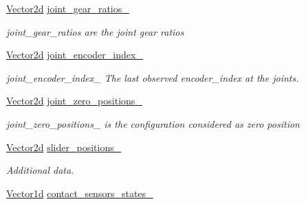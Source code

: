 \begin{DoxyCompactItemize}
\mbox{\label{classblmc__robots_1_1Teststand_ad7b3b6c032d1b1b9c886089ea21a9c2a}} 
\hyperlink{common__header_8hpp_acb6916bc8c9fe9d98c484fd4cc201447}{Vector2d} \hyperlink{classblmc__robots_1_1Teststand_ad7b3b6c032d1b1b9c886089ea21a9c2a}{joint\+\_\+gear\+\_\+ratios\+\_\+}
\begin{DoxyCompactList}\small\item\em joint\+\_\+gear\+\_\+ratios are the joint gear ratios \end{DoxyCompactList}\item 
\mbox{\label{classblmc__robots_1_1Teststand_a2a0b967c36ea63a8bb564bdeebcc0846}} 
\hyperlink{common__header_8hpp_acb6916bc8c9fe9d98c484fd4cc201447}{Vector2d} \hyperlink{classblmc__robots_1_1Teststand_a2a0b967c36ea63a8bb564bdeebcc0846}{joint\+\_\+encoder\+\_\+index\+\_\+}
\begin{DoxyCompactList}\small\item\em joint\+\_\+encoder\+\_\+index\+\_\+ The last observed encoder\+\_\+index at the joints. \end{DoxyCompactList}\item 
\mbox{\label{classblmc__robots_1_1Teststand_a5923674652df619a0692333fb27b8369}} 
\hyperlink{common__header_8hpp_acb6916bc8c9fe9d98c484fd4cc201447}{Vector2d} \hyperlink{classblmc__robots_1_1Teststand_a5923674652df619a0692333fb27b8369}{joint\+\_\+zero\+\_\+positions\+\_\+}
\begin{DoxyCompactList}\small\item\em joint\+\_\+zero\+\_\+positions\+\_\+ is the configuration considered as zero position \end{DoxyCompactList}\item 
\hyperlink{common__header_8hpp_acb6916bc8c9fe9d98c484fd4cc201447}{Vector2d} \hyperlink{classblmc__robots_1_1Teststand_ad0ce099eef5b57553d36927e3f7f1203}{slider\+\_\+positions\+\_\+}
\begin{DoxyCompactList}\small\item\em Additional data. \end{DoxyCompactList}\item 
\mbox{\label{classblmc__robots_1_1Teststand_a49bb3cd738af64ef41a9a3d12dde9ac2}} 
\hyperlink{common__header_8hpp_a932c1319d78144ebcaa8938ae070b784}{Vector1d} \hyperlink{classblmc__robots_1_1Teststand_a49bb3cd738af64ef41a9a3d12dde9ac2}{contact\+\_\+sensors\+\_\+states\+\_\+}

\end{DoxyCompactItemize}
